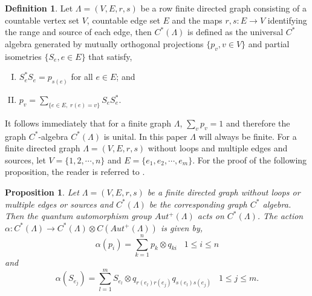 \documentclass{amsart}
\theoremstyle{plain}
\newtheorem{proposition}[subsection]{Proposition}
\theoremstyle{definition}
\newtheorem{definition}[subsection]{Definition}
\theoremstyle{remark}
\numberwithin{equation}{section}
\newcommand{\raro}{\rightarrow}
\begin{document}
\begin{definition}
Let $\Lambda=(V,E,r,s)$ be a row finite directed graph consisting of a  countable vertex set $V$, countable edge set $E$ and the maps $r,s:E\raro V$ identifying the range and source of each edge, then $C^{\ast}(\Lambda)$ is defined as the universal $C^{\ast}$ algebra generated by mutually orthogonal projections $\{p_{v},v\in V\}$ and partial isometries $\{S_{e}, e\in E\}$ that satisfy,
\begin{enumerate}[(I)]
     \setlength\itemsep{0.5em}
    \item $S_{e}^{\ast}S_{e}=p_{s(e)}$ for all $e\in E$; and 
    \item $p_{v}=\sum\limits_{\{e\in E,\; r(e)=v\}}S_{e}S_{e}^{\ast}$.
\end{enumerate}
\end{definition}
It follows immediately that for a finite graph $\Lambda$, $\sum\limits_{v} p_{v}=1$ and therefore the graph $C^{\ast}$-algebra $C^{\ast}(\Lambda)$ is unital. In this paper $\Lambda$ will always be finite. For a finite directed graph $\Lambda=(V,E,r,s)$ without loops and multiple edges and sources, let $V=\{1,2,\cdots,n\}$ and $E=\{e_{1},e_{2},\cdots,e_{m}\}$. For the proof of the following proposition, the reader is referred to  \cites{weber, joardar1}. 
\begin{proposition}
\label{actionofqaut}
Let $\Lambda=(V,E,r,s)$ be a finite directed graph without loops or multiple edges or sources and $C^{\ast}(\Lambda)$ be the corresponding graph $C^{\ast}$ algebra. Then the quantum automorphism group $Aut^{+}(\Lambda)$ acts on $C^{\ast}(\Lambda)$. The action $\alpha:C^{\ast}(\Lambda)\raro C^{\ast}(\Lambda)\otimes C(Aut^{+}(\Lambda))$ is given by, 
\begin{equation*}
   \alpha(p_{i})=\sum\limits_{k=1}^{n}p_{k}\otimes q_{ki}\;\;\;  1\leq i\leq n
\end{equation*}
and 
\begin{equation*}
   \alpha(S_{e_{j}})=\sum\limits_{l=1}^{m}S_{e_{l}}\otimes q_{r(e_{l})r(e_{j})}q_{s(e_{l})s(e_{j})} \;\;\; 1\leq j\leq m.
\end{equation*}
\end{proposition}
\end{document}
